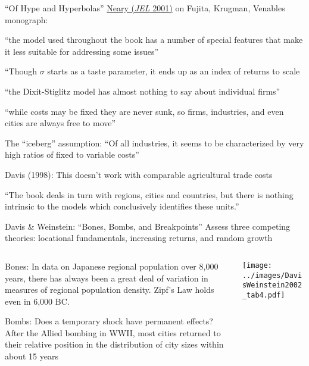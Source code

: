 \documentclass[10pt,notes=hide]{beamer}
\begin{document}
\begin{frame}{``Of Hype and Hyperbolas''}
\href{https://www.aeaweb.org/articles?id=10.1257/jel.39.2.536}{Neary (\textit{JEL} 2001)} on Fujita, Krugman, Venables monograph:
\begin{itemize}
{\small
\item ``the model used throughout the book has a number of special features that make it less suitable for addressing some issues''
\item ``Though $\sigma$ starts as a taste parameter, it ends up as an index of returns to scale
\item ``the Dixit-Stiglitz model has almost nothing to say about individual firms''
\item ``while costs may be fixed they are never sunk, so firms, industries, and even cities are always free to move''
\item The ``iceberg'' assumption: ``Of all industries, it seems to be characterized by very high ratios of fixed to variable costs''
\item Davis (1998): This doesn't work with comparable agricultural trade costs
\item ``The book deals in turn with regions, cities and countries, but there is nothing intrinsic to the models which conclusively identifies these units.''
}
\end{itemize}
\end{frame}
\begin{frame}{Davis \& Weinstein: ``Bones, Bombs, and Breakpoints''}
Assess three competing theories: locational fundamentals, increasing returns, and random growth
\begin{columns}
\begin{column}{.49\textwidth}
\begin{itemize}
	{\small
	\item {Bones: In data on Japanese regional population over 8,000 years, there has always been a great deal of variation in measures of regional population density. Zipf's Law holds even in 6,000 BC.\par}
	\item {Bombs: Does a temporary shock have permanent effects? After the Allied bombing in WWII, most cities returned to their relative position in the distribution of city sizes within about 15 years \par}
	}
\end{itemize}
\end{column}
\begin{column}{.49\textwidth}
\texttt{[image: ../images/DavisWeinstein2002\_tab4.pdf]}
\end{column}
\end{columns}
\end{frame}
\end{document}
